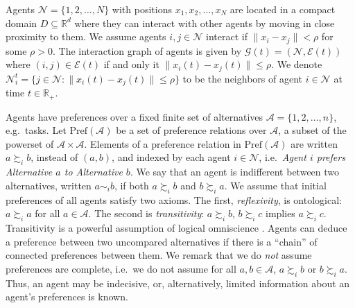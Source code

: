 \documentclass[conference]{ieeeconf}
\newcommand{\R}{\mathbb{R}}
\newcommand{\N}{\mathcal{N}}
\newcommand{\A}{\mathcal{A}}
\newcommand{\Pref}{\mathrm{Pref}}
\newcommand{\prefers}{\succsim}
\newcommand{\indif}{\sim}
\renewcommand{\leq}{\leqslant}
\newcommand{\graph}{\mathcal{G}}
\newcommand{\edges}{\mathcal{E}}
\begin{document}
Agents $\N = \{1,2,\dots, N\}$ with positions $x_1, x_2, \dots, x_N$ are located in a compact domain $D \subseteq \R^d$ where they can interact with other agents by moving in close proximity to them.
We assume agents $i, j \in \N$ interact if $\| x_i - x_j \| < \rho$ for some $\rho>0$. The interaction graph of agents is given by $\graph(t) = \left( \N, \edges(t) \right)$ where $(i,j) \in \mathcal{E}(t)$ if and only it $\| x_i(t) - x_j(t) \| \leq \rho$. We denote $\N_i^t = \{ j \in \N: \| x_i(t) - x_j(t) \| \leqslant \rho \}$ to be the neighbors of agent $i \in \N$ at time $t \in \R_{+}$.

Agents have preferences over a fixed finite set of alternatives $\A = \{1,2,\dots, n\}$, e.g.~tasks.  Let $\Pref(\A)$ be a set of preference relations over $\A$, a subset of the powerset of $\A \times \A$. Elements of a preference relation in $\Pref(\A)$ are written $a \prefers_i b$, instead of $(a,b)$, and indexed by each agent $i \in \N$, i.e.~\emph{Agent $i$ prefers Alternative $a$ to Alternative $b$}. We say that an agent is indifferent between two alternatives, written $a \indif_i b$, if both $a \prefers_i b$ and $b \prefers_i a$. We assume that initial preferences of all agents satisfy two axioms. The first, \emph{reflexivity}, is ontological: $a \prefers_i a$ for all $a \in \A$. The second is \emph{transitivity}: $a \prefers_i b$, $b \prefers_i c$ implies $a \prefers_i c$. Transitivity is a powerful assumption of logical omniscience \cite{fagin}. Agents can deduce a preference between two uncompared alternatives if there is a ``chain'' of connected preferences between them. We remark that we do \emph{not} assume preferences are complete, i.e.~we do not assume for all $a,b \in \A$, $a \prefers_i b$ or $b \prefers_i a$. Thus, an agent may be indecisive, or, alternatively, limited information about an agent's preferences is known.
\end{document}
